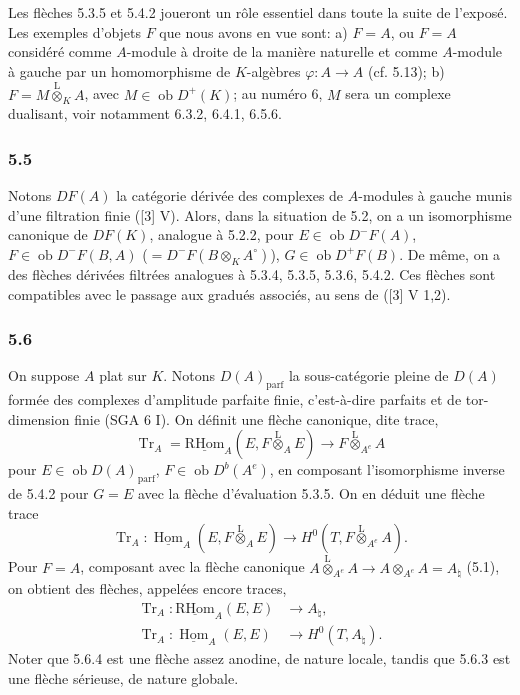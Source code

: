 \documentclass[11pt]{article}
\DeclareMathOperator{\Hom}{Hom}
\newcommand{\R}{\mathrm{R}}\newcommand{\RHomCore}{\mathrm{RHom}}
\newcommand{\ob}{\operatorname{ob}}
\providecommand{\RHom}{\RHomCore}
\providecommand{\uRHom}{\underline{\RHom}}
\providecommand{\uHom}{\underline{\Hom}}
\providecommand{\Tr}{\operatorname{Tr}}
\providecommand{\Tr}{\operatorname{Tr}}
\providecommand{\lten}{\overset{\mathrm L}{\otimes}}
\providecommand{\Tr}{\operatorname{Tr}}
\providecommand{\RHom}{\RHomCore}
\providecommand{\Hom}{\operatorname{Hom}}
\providecommand{\ob}{\operatorname{ob}}
\providecommand{\lten}{\overset{\mathrm L}{\otimes}}
\providecommand{\RHom}{\R\mathcal{H}om}
\providecommand{\lten}{\overset{\mathrm L}{\otimes}}
\providecommand{\R}{\mathrm R}
\providecommand{\Tr}{\operatorname{Tr}}
\providecommand{\lten}{\overset{\mathrm L}{\otimes}}
\providecommand{\lten}{\overset{\mathrm L}{\otimes}}
\providecommand{\lten}{\overset{\mathrm L}{\otimes}}
\providecommand{\RHom}{\RHomCore}
\providecommand{\Hom}{\operatorname{Hom}}
\providecommand{\Tr}{\operatorname{Tr}}
\providecommand{\lten}{\overset{\mathrm L}{\otimes}}
\begin{document}
Les flèches 5.3.5 et 5.4.2 joueront un rôle essentiel dans toute la suite de l'exposé. Les exemples d'objets $F$ que nous avons en vue sont: a) $F=A$, ou $F=A$ considéré comme $A$-module à droite de la manière naturelle et comme $A$-module à gauche par un homomorphisme de $K$-algèbres $\varphi:A\to A$ (cf. 5.13); b) $F=M\lten_KA$, avec $M\in\ob D^+(K)$; au numéro 6, $M$ sera un complexe dualisant, voir notamment 6.3.2, 6.4.1, 6.5.6.

\subsubsection*{5.5}

Notons $DF(A)$ la catégorie dérivée des complexes de $A$-modules à gauche munis d'une filtration finie ([3] V). Alors, dans la situation de 5.2, on a un isomorphisme canonique de $DF(K)$, analogue à 5.2.2, pour $E\in\ob D^-F(A)$, $F\in\ob D^-F(B,A)$ ($=D^-F(B\otimes_KA^\circ)$), $G\in\ob D^+F(B)$. De même, on a des flèches dérivées filtrées analogues à 5.3.4, 5.3.5, 5.3.6, 5.4.2. Ces flèches sont compatibles avec le passage aux gradués associés, au sens de ([3] V 1,2).

\subsubsection*{5.6}

On suppose $A$ plat sur $K$. Notons $D(A)_{\mathrm{parf}}$ la sous-catégorie pleine de $D(A)$ formée des complexes d'amplitude parfaite finie, c'est-à-dire parfaits et de tor-dimension finie (SGA 6 I). On définit une flèche canonique, dite trace,
\begin{equation}\tag{5.6.1}
\Tr_A=\uRHom_A(E,F\lten_AE)\longrightarrow F\lten_{A^e}A
\end{equation}
pour $E\in\ob D(A)_{\mathrm{parf}}$, $F\in\ob D^b(A^e)$, en composant l'isomorphisme inverse de 5.4.2 pour $G=E$ avec la flèche d'évaluation 5.3.5. On en déduit une flèche trace
\begin{equation}\tag{5.6.2}
\Tr_A:\uHom_A(E,F\lten_AE)\longrightarrow H^0(T,F\lten_{A^e}A).
\end{equation}
Pour $F=A$, composant avec la flèche canonique $A\lten_{A^e}A\to A\otimes_{A^e}A=A_\natural$ (5.1), on obtient des flèches, appelées encore traces,
\begin{align}
\Tr_A:\uRHom_A(E,E)&\longrightarrow A_\natural,\tag{5.6.3}\\
\Tr_A:\uHom_A(E,E)&\longrightarrow H^0(T,A_\natural).\tag{5.6.4}
\end{align}
Noter que 5.6.4 est une flèche assez anodine, de nature locale, tandis que 5.6.3 est une flèche sérieuse, de nature globale.
\end{document}
